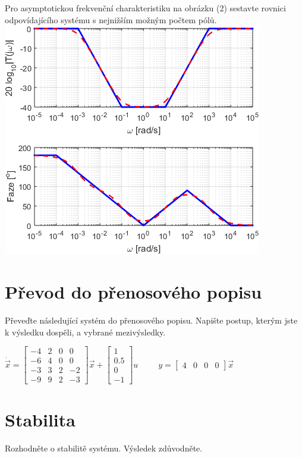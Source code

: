 \documentclass[twoside]{article}
\begin{document}
\subsection{~}
Pro asymptotickou frekvenční charakteristiku na obrázku (2) sestavte rovnici odpovídajícího systému
s nejnižším možným počtem pólů.
\includegraphics{zadani4-2.png}

\section{ Převod do přenosového popisu}
\label{sec:ukol5}
Převeďte následující systém do přenosového popisu. Napište postup, kterým jste k výsledku dospěli, a vybrané mezivýsledky.

\begin{math}
	\dot{\vec{x}} = \begin{bmatrix}
		-4 & 2 & 0 & 0 \\
		-6 & 4 & 0 & 0 \\
		-3 & 3 & 2 & -2 \\
		-9 & 9 & 2 & -3
	\end{bmatrix} \vec{x} + \begin{bmatrix}
		1 \\
		0.5 \\
	0 \\
	-1
\end{bmatrix} u ~~~~~~~~~~~
y = \begin{bmatrix}
	4 & 0 & 0 & 0
\end{bmatrix} \vec{x}
\end{math}

\section{Stabilita}
\label{sec:ukol6}
Rozhodněte o stabilitě systému. Výsledek zdůvodněte.
\end{document}
